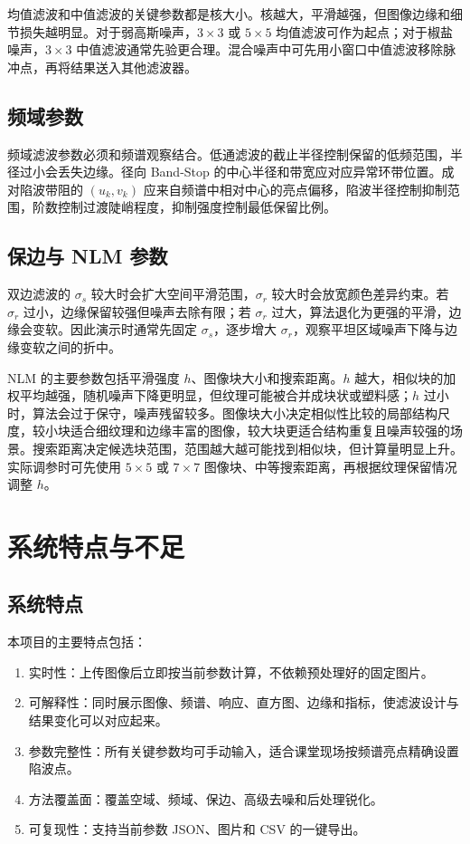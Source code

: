 \documentclass[UTF8,a4paper,12pt]{ctexart}
\begin{document}
均值滤波和中值滤波的关键参数都是核大小。核越大，平滑越强，但图像边缘和细节损失越明显。对于弱高斯噪声，$3\times3$ 或 $5\times5$ 均值滤波可作为起点；对于椒盐噪声，$3\times3$ 中值滤波通常先验更合理。混合噪声中可先用小窗口中值滤波移除脉冲点，再将结果送入其他滤波器。

\subsection{频域参数}

频域滤波参数必须和频谱观察结合。低通滤波的截止半径控制保留的低频范围，半径过小会丢失边缘。径向 Band-Stop 的中心半径和带宽应对应异常环带位置。成对陷波带阻的 $(u_k,v_k)$ 应来自频谱中相对中心的亮点偏移，陷波半径控制抑制范围，阶数控制过渡陡峭程度，抑制强度控制最低保留比例。

\subsection{保边与 NLM 参数}

双边滤波的 $\sigma_s$ 较大时会扩大空间平滑范围，$\sigma_r$ 较大时会放宽颜色差异约束。若 $\sigma_r$ 过小，边缘保留较强但噪声去除有限；若 $\sigma_r$ 过大，算法退化为更强的平滑，边缘会变软。因此演示时通常先固定 $\sigma_s$，逐步增大 $\sigma_r$，观察平坦区域噪声下降与边缘变软之间的折中。

NLM 的主要参数包括平滑强度 $h$、图像块大小和搜索距离。$h$ 越大，相似块的加权平均越强，随机噪声下降更明显，但纹理可能被合并成块状或塑料感；$h$ 过小时，算法会过于保守，噪声残留较多。图像块大小决定相似性比较的局部结构尺度，较小块适合细纹理和边缘丰富的图像，较大块更适合结构重复且噪声较强的场景。搜索距离决定候选块范围，范围越大越可能找到相似块，但计算量明显上升。实际调参时可先使用 $5\times5$ 或 $7\times7$ 图像块、中等搜索距离，再根据纹理保留情况调整 $h$。

\section{系统特点与不足}

\subsection{系统特点}

本项目的主要特点包括：
\begin{enumerate}
  \item 实时性：上传图像后立即按当前参数计算，不依赖预处理好的固定图片。
  \item 可解释性：同时展示图像、频谱、响应、直方图、边缘和指标，使滤波设计与结果变化可以对应起来。
  \item 参数完整性：所有关键参数均可手动输入，适合课堂现场按频谱亮点精确设置陷波点。
  \item 方法覆盖面：覆盖空域、频域、保边、高级去噪和后处理锐化。
  \item 可复现性：支持当前参数 JSON、图片和 CSV 的一键导出。
\end{enumerate}
\end{document}

